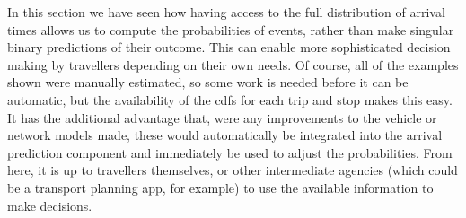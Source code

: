 In this section we have seen how having access to the full distribution of arrival times allows us to compute the probabilities of events, rather than make singular binary predictions of their outcome. This can enable more sophisticated decision making by travellers depending on their own needs. Of course, all of the examples shown were manually estimated, so some work is needed before it can be automatic, but the availability of the \glspl{cdf} for each trip and stop makes this easy. It has the additional advantage that, were any improvements to the vehicle or network models made, these would automatically be integrated into the arrival prediction component and immediately be used to adjust the probabilities. From here, it is up to travellers themselves, or other intermediate agencies (which could be a transport planning app, for example) to use the available information to make decisions.
